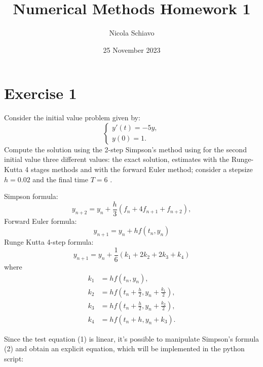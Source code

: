 \documentclass[a4paper,12pt]{article}
\title{Numerical Methods Homework 1}
\author{Nicola Schiavo}
\date{25 November 2023}
\begin{document}
\maketitle

\section{Exercise 1}

Consider the initial value problem given by:
\begin{equation}
\begin{cases}
y'(t) = -5y , \\
y(0) = 1.
\end{cases}
\end{equation}
Compute the solution using the 2-step Simpson's method using for the second initial value three different values: the exact solution, estimates with the Runge-Kutta 4 stages methods and with the forward Euler method; consider a stepsize $h = 0.02$ and the final time $T = 6$ .

Simpson formula:  \begin{equation}
    y_{n+2} = y_n + \frac{h}{3} (f_n + 4f_{n+1} + f_{n+2}),
\end{equation}
Forward Euler formula:
\begin{equation}
y_{n+1} = y_n + hf(t_n, y_n)
\end{equation}
Runge Kutta 4-step formula:
\begin{equation}
y_{n+1} = y_n + \frac{1}{6}(k_1 + 2k_2 + 2k_3 + k_4)
\end{equation}
where
\begin{align*}
k_1 &= hf(t_n, y_n), \\
k_2 &= hf\left(t_n + \frac{h}{2}, y_n + \frac{k_1}{2}\right), \\
k_3 &= hf\left(t_n + \frac{h}{2}, y_n + \frac{k_2}{2}\right), \\
k_4 &= hf(t_n + h, y_n + k_3).
\end{align*}

Since the test equation (1) is linear, it's possible to manipulate Simpson's formula (2) and obtain an explicit equation, which will be implemented in the python script:
\end{document}
